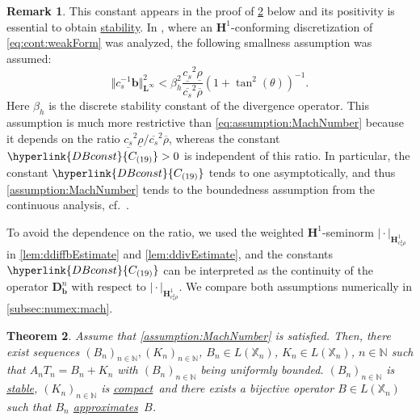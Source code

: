 \documentclass{m2an}
\newcommand{\csr}{c_s^2 \rho}
\newcommand{\bflow}{\mathbf{b}}
\newcommand{\Xn}{\mathbb{X}_n}
\newcommand{\bH}{{\mathbf H}}
\newcommand{\bD}{\mathbf{D}}
\newcommand{\bL}{\mathbf{L}}
\newcommand{\N}{\mathbb{N}}
\newcommand{\seq}[1]{(#1_n)_{n \in \mathbb{N}}}
\newcommand{\ddiffb}{\bD_{\bflow}^n}
\newcommand\stable{\hyperlink{stable}{stable}}
\newcommand\stability{\hyperlink{stable}{stability}}
\newcommand\compactop{\hyperlink{compactop}{compact}}
\newcommand\approximates{\hyperlink{approximate}{approximates}}
\newcommand{\DBconst}{\hyperlink{DBconst}{C_{(19)}}}
\theoremstyle{plain}
\newtheorem{theorem}{Theorem}%
\theoremstyle{definition}
\newtheorem{remark}[theorem]{Remark}
\begin{document}
\begin{remark}
   This constant appears in the proof of \cref{thm:weakTcompatibilityFulfilled} below and its positivity is essential to obtain \stability. In \cite{HLS22H1}, where an $\bH^1$-conforming discretization of \eqref{eq:cont:weakForm} was analyzed, the following smallness assumption was assumed:
   \begin{equation}\label{eq:MnAssump:H1}
      \Vert c_s^{-1} \bflow \Vert^2_{\bL^\infty} < \beta_h^2 \frac{\underline{c_s}^2 \underline{\rho}}{\overline{c_s}^2 \overline{\rho}} (1 + \tan^2(\theta))^{-1}. 
   \end{equation}
   Here $\beta_h$ is the discrete stability constant of the divergence operator. 
   This assumption is much more restrictive than \eqref{eq:assumption:MachNumber} because it depends on the ratio $\underline{c_s}^2 \underline{\rho} / \overline{c_s}^2 \overline{\rho}$, whereas the constant $\DBconst > 0$ is independent of this ratio. In particular, the constant $\DBconst$ tends to one asymptotically, and thus \cref{assumption:MachNumber} tends to the boundedness assumption from the continuous analysis, cf.~\cite[Thm.~3.11]{HH21}.
   
   To avoid the dependence on the ratio, we used the weighted $\bH^1$-seminorm $\vert \cdot \vert_{\bH^1_{\csr}}$ in \cref{lem:ddiffbEstimate} and \cref{lem:ddivEstimate}, and the constants $\DBconst$ can be interpreted as the continuity of the operator $\ddiffb$ with respect to $\vert \cdot \vert_{\bH^1_{\csr}}$. We compare both assumptions numerically in \cref{subsec:numex:mach}.
\end{remark}


\begin{theorem}\label{thm:weakTcompatibilityFulfilled}
   Assume that \cref{assumption:MachNumber} is satisfied. Then, there exist sequences $\seq{B}, \seq{K}$, $B_n \in L(\Xn)$, $K_n \in L(\Xn)$, $n \in \N$ such that $A_n T_n = B_n + K_n$ with $\seq{B}$ being uniformly bounded. $\seq{B}$ is \stable, $\seq{K}$ is \compactop~and there exists a bijective operator $B \in L(\Xn)$ such that $B_n$ \approximates~$B$. 
\end{theorem}
\end{document}
